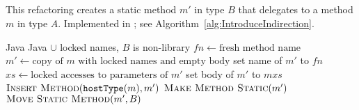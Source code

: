\subsection{}
This refactoring creates a static method $m'$ in type $B$ that delegates to a method $m$ in type $A$. Implemented in ; see Algorithm~\ref{alg:IntroduceIndirection}.

\begin{algorithm}[p]
\caption{$\refactoring{Introduce Indirection}(m : \type{Method}, B : \type{ClassOrInterface})$}
\label{alg:IntroduceIndirection}
\begin{algorithmic}[1]
\REQUIRE Java
\ENSURE Java $\cup$ locked names, 
\medskip
\STATE \assert $B$ is non-library
\STATE $fn \leftarrow \text{fresh method name}$
\STATE $m' \leftarrow \text{copy of $m$ with locked names and empty body}$
\STATE set name of $m'$ to $fn$
\STATE $xs \leftarrow \text{locked accesses to parameters of $m'$}$
\STATE set body of $m'$ to \xspace$m$\code{(}$xs$\code{);}
\STATE $\textsc{Insert Method}(\text{\texttt{hostType}}(m), m')$
\STATE $\textsc{Make Method Static}(m')$
\STATE $\textsc{Move Static Method}(m', B)$
\end{algorithmic}
\end{algorithm}

